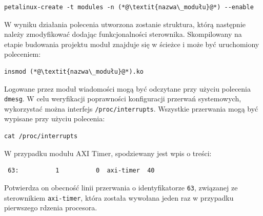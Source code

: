 \begin{lstlisting}[breaklines=true]
petalinux-create -t modules -n (*@\textit{nazwa\_modułu}@*) --enable
\end{lstlisting}

W wyniku działania polecenia utworzona zostanie struktura, którą następnie należy zmodyfikować dodając funkcjonalności sterownika.
Skompilowany na etapie budowania projektu moduł znajduje się w ścieżce  i może być uruchomiony poleceniem:

\begin{lstlisting}
insmod (*@\textit{nazwa\_modułu}@*).ko
\end{lstlisting}

Logowane przez moduł wiadomości mogą być odczytane przy użyciu polecenia \texttt{dmesg}.
W celu weryfikacji poprawności konfiguracji przerwań systemowych, wykorzystać można interfejs \texttt{/proc/interrupts}.
Wszystkie przerwania mogą być wypisane przy użyciu polecenia:

\begin{lstlisting}
cat /proc/interrupts
\end{lstlisting}

W przypadku modułu AXI Timer, spodziewany jest wpis o treści:
\begin{lstlisting}
 63:          1          0  axi-timer  40
\end{lstlisting}
Potwierdza on obecność linii przerwania o identyfikatorze \texttt{63}, związanej ze sterownikiem \texttt{axi-timer}, która została wywołana jeden raz w przypadku pierwszego rdzenia procesora.

